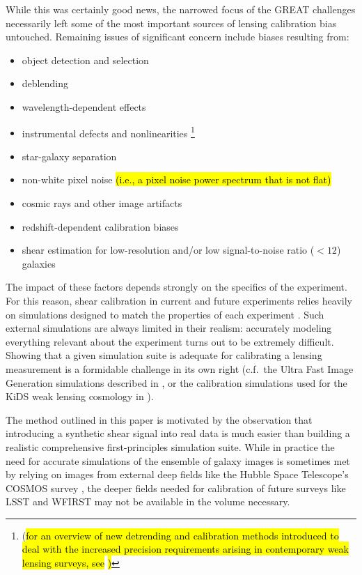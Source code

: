 \documentclass[iop]{emulateapj}
\begin{document}
While this was certainly good news, the narrowed focus of the GREAT
challenges necessarily left some of the most important sources of
lensing calibration bias untouched. Remaining issues of significant
concern include biases resulting from:
\begin{itemize}
\item object detection and selection
\item deblending
\item wavelength-dependent effects
\item instrumental defects and nonlinearities \footnote{(\hl{for an overview of new
  detrending and calibration methods introduced to deal with the increased precision requirements
  arising in contemporary weak lensing surveys, see} \citealt{2017PASP..129k4502B}\hl{)}}
\item star-galaxy separation
\item non-white pixel noise \hl{(i.e., a pixel noise power spectrum that
  is not flat)}
\item cosmic rays and other image artifacts
\item redshift-dependent calibration biases
\item shear estimation for low-resolution and/or low signal-to-noise ratio ($<12$) galaxies
\end{itemize}
The impact of these factors depends strongly on the specifics of the
experiment. For this reason, shear calibration in current and future
experiments relies heavily on simulations designed to match the
properties of each experiment
\citep{KiDS450,2016MNRAS.tmp..827J}. Such external simulations are
always limited in their realism:  accurately modeling everything
relevant about the experiment turns out to be extremely difficult. Showing that a given simulation suite
is adequate for calibrating a lensing measurement is a formidable
challenge in its own right (c.f.\ the Ultra Fast Image Generation
simulations described in \citealt{2013A&C.....1...23B}, or the
calibration simulations used for the KiDS weak lensing cosmology in
\citealt{2016arXiv160605337F}).

The method outlined in this paper is motivated by the observation that
introducing a synthetic shear signal into real data is much easier
than building a realistic comprehensive first-principles simulation
suite. While in practice the need for accurate simulations of the
ensemble of galaxy images is sometimes met by relying on images from
external deep fields like the Hubble Space Telescope's COSMOS survey
\citep{2007ApJS..172..196K,2007ApJS..172....1S,2007ApJS..172...38S},
the deeper fields needed for calibration of future surveys like LSST
and WFIRST may not be available in the volume necessary.
\end{document}
